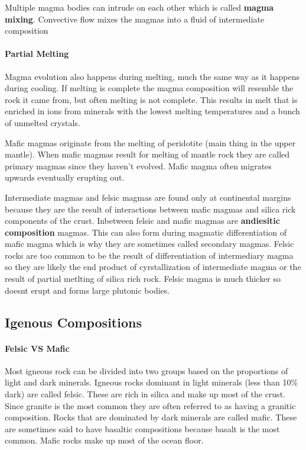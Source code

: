 \documentclass{article}
\begin{document}
Multiple magma bodies can intrude on each other which is called \textbf{magma mixing}. Convective flow mixes the magmas into a fluid of intermediate composition


\paragraph{Partial Melting} %
\label{par:partial_melting}
Magma evolution also happens during melting, much the same way as it happens during cooling. If melting is complete the magma composition will resemble the rock it came from, but often melting is not complete. This results in melt that is enriched in ions from minerals with the lowest melting temperatures and a bunch of unmelted crystals.

Mafic magmas originate from the melting of peridotite (main thing in the upper mantle). When mafic magmas result for melting of mantle rock they are called primary magmas since they haven't evolved. Mafic magma often migrates upwards eventually erupting out.

Intermediate magmas  and felsic magmas are found only at continental margins because they are the result of interactions between mafic magmas and silica rick components of the crust. Inbetween felsic and mafic magmas are \textbf{andiesitic composition} magmas. This can also form during magmatic differentiation of mafic magma which is why they are sometimes called secondary magmas. Felsic rocks are too common to be the result of differentiation of intermediary magma so they are likely the end product of cyrstallization of intermediate magma or the result of partial metlting of silica rich rock. Felsic magma is much thicker so doesnt erupt and forms large plutonic bodies.



\subsection{Igenous Compositions} %
\label{sub:igenous_compositions}
\paragraph{Felsic VS Mafic} %
\label{par:felsic_vs_mafic}
Most igneous rock can be divided into two groups based on the proportions of light and dark minerals. Igneous rocks dominant in light minerals (less than 10\% dark) are called felsic. These are rich in silica and make up most of the crust. Since granite is the most common they are often referred to as having a granitic composition. Rocks that are dominated by dark minerals are called mafic. These are sometimes said to have basaltic compositions because basalt is the most common. Mafic rocks make up most of the ocean floor.
\end{document}
